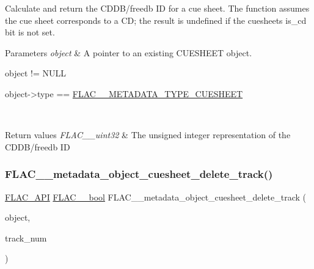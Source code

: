 Calculate and return the C\+D\+D\+B/freedb ID for a cue sheet. The function assumes the cue sheet corresponds to a CD; the result is undefined if the cuesheet\textquotesingle{}s is\+\_\+cd bit is not set.


\begin{DoxyParams}{Parameters}
{\em object} & A pointer to an existing C\+U\+E\+S\+H\+E\+ET object.  
\begin{DoxyCode}
\textcolor{keywordtype}{object} != NULL 
\end{DoxyCode}
 
\begin{DoxyCode}
\textcolor{keywordtype}{object}->type == \hyperlink{group__flac__format_ggac71714ba8ddbbd66d26bb78a427fac01a0b3f07ae60609126562cd0233ce00a65}{FLAC\_\_METADATA\_TYPE\_CUESHEET} 
\end{DoxyCode}
 \\
\hline
\end{DoxyParams}

\begin{DoxyRetVals}{Return values}
{\em F\+L\+A\+C\+\_\+\+\_\+uint32} & The unsigned integer representation of the C\+D\+D\+B/freedb ID \\
\hline
\end{DoxyRetVals}
\mbox{\label{group__flac__metadata__object_ga3232bae96f19722bee19afd37fdc214d}} 
\subsubsection{\texorpdfstring{F\+L\+A\+C\+\_\+\+\_\+metadata\+\_\+object\+\_\+cuesheet\+\_\+delete\+\_\+track()}{FLAC\_\_metadata\_object\_cuesheet\_delete\_track()}}
{\footnotesize\ttfamily \hyperlink{group__flac__export_ga56ca07df8a23310707732b1c0007d6f5}{F\+L\+A\+C\+\_\+\+A\+PI} \hyperlink{ordinals_8h_a95103469f1cbd78b8cf250194985b34e}{F\+L\+A\+C\+\_\+\+\_\+bool} F\+L\+A\+C\+\_\+\+\_\+metadata\+\_\+object\+\_\+cuesheet\+\_\+delete\+\_\+track (\begin{DoxyParamCaption}\item[{\hyperlink{struct_f_l_a_c_____stream_metadata}{F\+L\+A\+C\+\_\+\+\_\+\+Stream\+Metadata} $\ast$}]{object,  }\item[{unsigned}]{track\+\_\+num }\end{DoxyParamCaption})}

